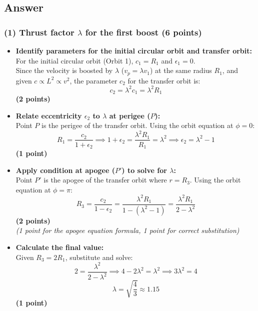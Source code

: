 \documentclass[11pt, a4paper]{article} %
\begin{document}
\subsection*{Answer}

\subsubsection*{(1) Thrust factor $\lambda$ for the first boost (6 points)}
\begin{itemize}
    \item \textbf{Identify parameters for the initial circular orbit and transfer orbit:} \\
    For the initial circular orbit (Orbit 1), $c_1 = R_1$ and $\epsilon_1 = 0$. \\
    Since the velocity is boosted by $\lambda$ ($v_p = \lambda v_1$) at the same radius $R_1$, and given $c \propto L^2 \propto v^2$, the parameter $c_2$ for the transfer orbit is:
    \[
    c_2 = \lambda^2 c_1 = \lambda^2 R_1
    \]
    \hfill \textbf{(2 points)}

    \item \textbf{Relate eccentricity $\epsilon_2$ to $\lambda$ at perigee ($P$):} \\
    Point $P$ is the perigee of the transfer orbit. Using the orbit equation at $\phi=0$:
    \[
    R_1 = \frac{c_2}{1 + \epsilon_2} \implies 1 + \epsilon_2 = \frac{\lambda^2 R_1}{R_1} = \lambda^2 \implies \epsilon_2 = \lambda^2 - 1
    \]
    \hfill \textbf{(1 point)}

    \item \textbf{Apply condition at apogee ($P'$) to solve for $\lambda$:} \\
    Point $P'$ is the apogee of the transfer orbit where $r = R_3$. Using the orbit equation at $\phi=\pi$:
    \[
    R_3 = \frac{c_2}{1 - \epsilon_2} = \frac{\lambda^2 R_1}{1 - (\lambda^2 - 1)} = \frac{\lambda^2 R_1}{2 - \lambda^2}
    \]
    \hfill \textbf{(2 points)} \\
    \textit{(1 point for the apogee equation formula, 1 point for correct substitution)}

    \item \textbf{Calculate the final value:} \\
    Given $R_3 = 2R_1$, substitute and solve:
    \[
    2 = \frac{\lambda^2}{2 - \lambda^2} \implies 4 - 2\lambda^2 = \lambda^2 \implies 3\lambda^2 = 4
    \]
    \[
    \lambda = \sqrt{\frac{4}{3}} \approx 1.15
    \]
    \hfill \textbf{(1 point)}
\end{itemize}
\end{document}
